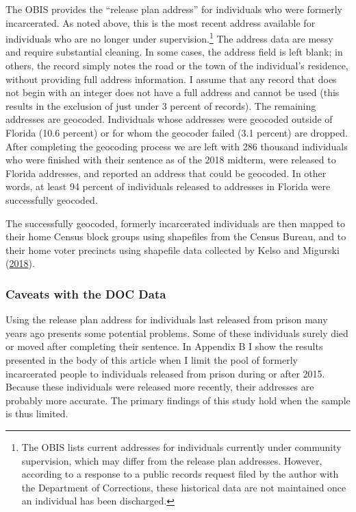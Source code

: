 \documentclass[
  12pt,
]{article}
\begin{document}
The OBIS provides the ``release plan address'' for individuals who were formerly incarcerated. As noted above, this is the most recent address available for individuals who are no longer under supervision.\footnote{The OBIS lists current addresses for individuals currently under community supervision, which may differ from the release plan addresses. However, according to a response to a public records request filed by the author with the Department of Corrections, these historical data are not maintained once an individual has been discharged.} The address data are messy and require substantial cleaning. In some cases, the address field is left blank; in others, the record simply notes the road or the town of the individual's residence, without providing full address information. I assume that any record that does not begin with an integer does not have a full address and cannot be used (this results in the exclusion of just under 3 percent of records). The remaining addresses are geocoded. Individuals whose addresses were geocoded outside of Florida (10.6 percent) or for whom the geocoder failed (3.1 percent) are dropped. After completing the geocoding process we are left with 286 thousand individuals who were finished with their sentence as of the 2018 midterm, were released to Florida addresses, and reported an address that could be geocoded. In other words, at least 94 percent of individuals released to addresses in Florida were successfully geocoded.

The successfully geocoded, formerly incarcerated individuals are then mapped to their home Census block groups using shapefiles from the Census Bureau, and to their home voter precincts using shapefile data collected by Kelso and Migurski (\protect\hyperlink{ref-Kelso2018}{2018}).

\hypertarget{caveats-with-the-doc-data}{%
\subsubsection*{Caveats with the DOC Data}\label{caveats-with-the-doc-data}}

Using the release plan address for individuals last released from prison many years ago presents some potential problems. Some of these individuals surely died or moved after completing their sentence. In Appendix B I show the results presented in the body of this article when I limit the pool of formerly incarcerated people to individuals released from prison during or after 2015. Because these individuals were released more recently, their addresses are probably more accurate. The primary findings of this study hold when the sample is thus limited.
\end{document}
